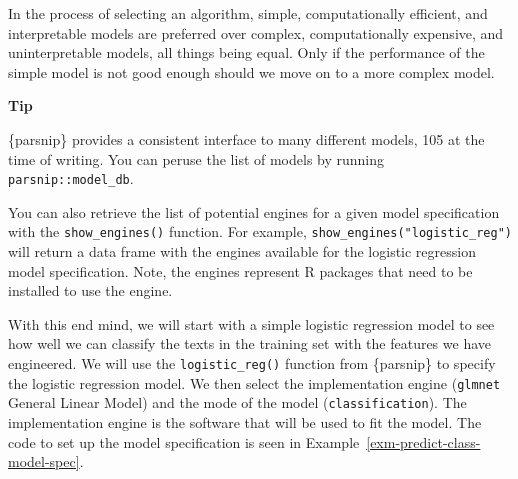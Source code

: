 \documentclass[
  letterpaper,
  krantz1]{latex/krantz-mod}
\theoremstyle{definition}
\theoremstyle{definition}
\theoremstyle{remark}
\begin{document}
In the process of selecting an algorithm, simple, computationally
efficient, and interpretable models are preferred over complex,
computationally expensive, and uninterpretable models, all things being
equal. Only if the performance of the simple model is not good enough
should we move on to a more complex model.

\begin{tcolorbox}[enhanced jigsaw, toprule=.15mm, breakable, colback=white, arc=.35mm, left=2mm, colframe=quarto-callout-color-frame, opacityback=0, bottomrule=.15mm, rightrule=.15mm, leftrule=.75mm]

\textbf{ Tip}

\{parsnip\} provides a consistent interface to many different models,
105 at the time of writing. You can peruse the list of models by running
\texttt{parsnip::model\_db}.

You can also retrieve the list of potential engines for a given model
specification with the \texttt{show\_engines()} function. For example,
\texttt{show\_engines("logistic\_reg")} will return a data frame with
the engines available for the logistic regression model specification.
Note, the engines represent R packages that need to be installed to use
the engine.

\end{tcolorbox}

With this end mind, we will start with a simple logistic
regression model to see how well we can
classify the texts in the training set with the features we have
engineered. We will use the \texttt{logistic\_reg()} function from
\{parsnip\} to specify the logistic regression model. We then select the
implementation engine (\texttt{glmnet} General Linear Model) and the
mode of the model (\texttt{classification}). The implementation engine
is the software that will be used to fit the model. The code to set up
the model specification is seen in
Example~\ref{exm-predict-class-model-spec}.
\end{document}
